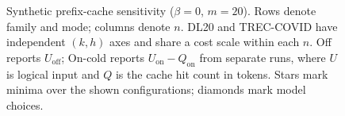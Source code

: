 \begin{figure}[t]
\endgroup
\caption{Synthetic prefix-cache sensitivity ($\beta=0$, $m=20$). Rows denote family and mode; columns denote $n$. DL20 and TREC-COVID have independent $(k,h)$ axes and share a cost scale within each $n$. Off reports $U_{\mathrm{off}}$; On-cold reports $U_{\mathrm{on}}-Q_{\mathrm{on}}$ from separate runs, where $U$ is logical input and $Q$ is the cache hit count in tokens. Stars mark minima over the shown configurations; diamonds mark model choices.}
\label{fig:e4a-c2}
\end{figure}
